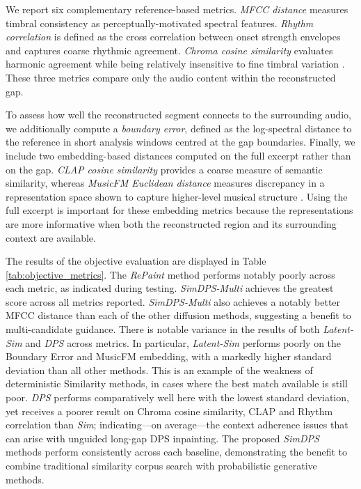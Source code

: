 \documentclass{article}
\begin{document}
We report six complementary reference-based metrics. 
\emph{MFCC distance} measures timbral consistency as perceptually-motivated spectral features. \emph{Rhythm correlation} is defined as the cross correlation between onset strength envelopes and captures coarse rhythmic agreement.
\emph{Chroma cosine similarity}  \cite{copet2023simple} evaluates harmonic agreement while being relatively insensitive to fine timbral variation .
These three metrics compare only the audio content within the reconstructed gap. 

To assess how well the reconstructed segment connects to the surrounding audio, we additionally compute a \emph{boundary error}, defined as the log-spectral distance to the reference in short analysis windows centred at the gap boundaries. Finally, we include two embedding-based distances computed on the full excerpt rather than on the gap. \emph{CLAP cosine similarity} provides a coarse measure of semantic similarity, whereas \emph{MusicFM Euclidean distance} measures discrepancy in a representation space shown to capture higher-level musical structure \cite{won2024foundation,toyama2025foundational}. Using the full excerpt is important for these embedding metrics because the representations are more informative when both the reconstructed region and its surrounding context are available. 


The results of the objective evaluation are displayed in Table \ref{tab:objective_metrics}. 
The \textit{RePaint} method performs notably poorly across each metric, as indicated during testing.
\textit{SimDPS-Multi} achieves the greatest score across all metrics reported.
\textit{SimDPS-Multi} also achieves a notably better MFCC distance than each of the other diffusion methods, suggesting a benefit to multi-candidate guidance. 
There is notable variance in the results of both \textit{Latent-Sim} and \textit{DPS} across metrics.
In particular, \textit{Latent-Sim} performs poorly on the Boundary Error and MusicFM embedding, with a markedly higher standard deviation than all other methods. This is an example of the weakness of deterministic Similarity methods, in cases where the best match available is still poor.
\textit{DPS} performs comparatively well here with the lowest standard deviation, yet receives a poorer result on Chroma cosine similarity, CLAP and Rhythm correlation than \textit{Sim}; indicating---on average---the context adherence issues that can arise with unguided long-gap DPS inpainting. The proposed \textit{SimDPS} methods perform consistently across each baseline, demonstrating the benefit to combine traditional similarity corpus search with probabilistic generative methods.
\end{document}
